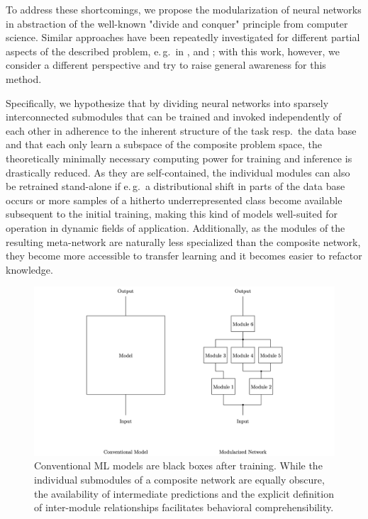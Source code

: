 To address these shortcomings, we propose the modularization of neural networks in abstraction of the well-known "divide and conquer" principle from computer science. Similar approaches have been repeatedly investigated for different partial aspects of the described problem, e.\,g.\ in \cite{Jacobs1991-fo}, \cite{Yan2015-go} and \cite{Roy2020-rv}; with this work, however, we consider a different perspective and try to raise general awareness for this method.

Specifically, we hypothesize that by dividing neural networks into sparsely interconnected submodules that can be trained and invoked independently of each other in adherence to the inherent structure of the task resp.\ the data base and that each only learn a subspace of the composite problem space, the theoretically minimally necessary computing power for training and inference is drastically reduced. As they are self-contained, the individual modules can also be retrained stand-alone if e.\,g.\ a distributional shift in parts of the data base occurs or more samples of a hitherto underrepresented class become available subsequent to the initial training, making this kind of models well-suited for operation in dynamic fields of application. Additionally, as the modules of the resulting meta-network are naturally less specialized than the composite network, they become more accessible to transfer learning and it becomes easier to refactor knowledge.

\pagebreak

\begin{figure}[htb]
    \centering
	    \includegraphics[width=\textwidth, trim=250 0 250 0, clip]{thesis/graphics/graphics/basic_concept.jpeg}
    \caption{Conventional ML models are black boxes after training. While the individual submodules of a composite network are equally obscure, the availability of intermediate predictions and the explicit definition of inter-module relationships facilitates behavioral comprehensibility.}
    \label{fig:modularization_basic_concept}
\end{figure}

